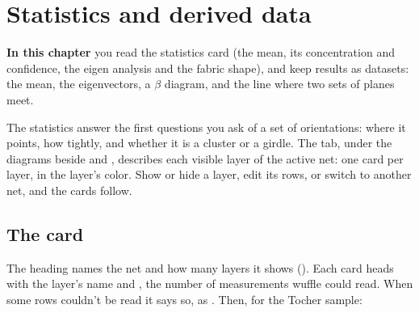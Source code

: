\chapter{Statistics and derived data}\label{ch:stats}
\begin{goals}
\textbf{In this chapter} you read the statistics card (the mean, its concentration and confidence, the
eigen analysis and the fabric shape), and keep results as datasets: the mean, the eigenvectors, a
$\beta$ diagram, and the line where two sets of planes meet.
\end{goals}

The statistics answer the first questions you ask of a set of orientations: where it points, how
tightly, and whether it is a cluster or a girdle. The  tab, under the
diagrams beside  and , describes each visible layer of the active net: one card per
layer, in the layer's color. Show or hide a layer, edit its rows, or switch to another net, and the cards
follow.


\section{The card}\label{sec:stats-card}

The heading names the net and how many layers it shows (). Each card heads with the
layer's name and , the number of measurements wuffle could read. When some rows couldn't be read it
says so, as . Then, for the Tocher sample:

